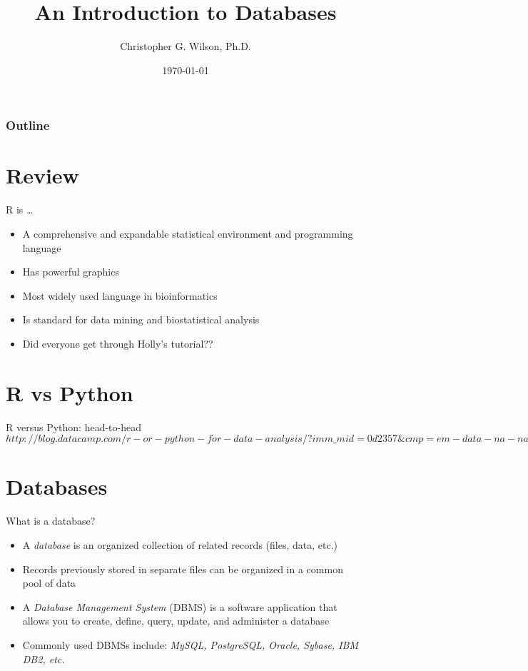 \documentclass{beamer}
\title[]{An Introduction to Databases}
\author[]{Christopher G. Wilson, Ph.D.}
\date{\today}
\institute[LLU]{Loma Linda University\\
Dept. of Pediatrics and Center for Perinatal Biology}
\begin{document}
\begin{frame}
\titlepage
\end{frame}

\begin{frame}
\frametitle{Outline}
\tableofcontents
\end{frame}

\section[]{Review}

\begin{frame}{R is \ldots}
\begin{itemize}
\item A comprehensive and expandable statistical environment and programming language 
\item Has powerful graphics
\item Most widely used language in bioinformatics
\item Is standard for data mining and biostatistical analysis 
\item Did everyone get through Holly's tutorial??
\end{itemize} 
\end{frame}

\section[]{R vs Python}
\begin{frame}{R versus Python: head-to-head}
$http://blog.datacamp.com/r-or-python-for-data-analysis/?imm\_mid=0d2357\&cmp=em-data-na-na-newsltr\_20150520$
\end{frame}

\section[]{Databases}
\begin{frame}{What is a database?}
\begin{itemize}
\item A \emph{database} is an organized collection of related records (files, data, etc.) 
\item Records previously stored in separate files can be organized in a common pool of data
\item A \emph{Database Management System} (DBMS) is a software application that allows you to create, define, query, update, and administer a database
\item Commonly used DBMSs include: \emph{MySQL, PostgreSQL, Oracle, Sybase, IBM DB2, etc.} 
\end{itemize} 
\end{frame}
\end{document}

